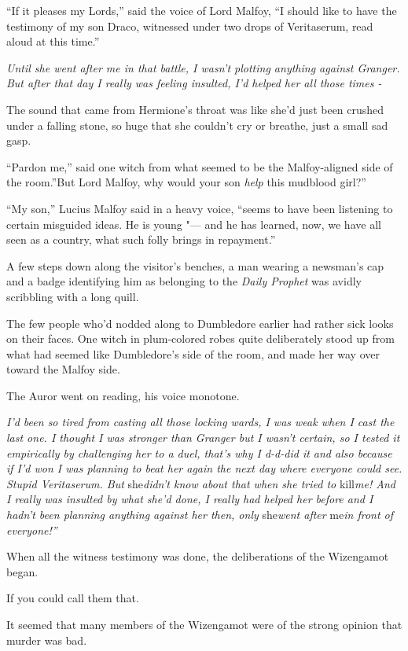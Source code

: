 ``If it pleases my Lords,'' said the voice of Lord Malfoy, ``I should
like to have the testimony of my son Draco, witnessed under two drops of
Veritaserum, read aloud at this time.''

\emph{Until she went after me in that battle, I wasn't plotting anything
against Granger. But after that day I really was feeling insulted, I'd
helped her all those times -}

The sound that came from Hermione's throat was like she'd just been
crushed under a falling stone, so huge that she couldn't cry or breathe,
just a small sad gasp.

``Pardon me,'' said one witch from what seemed to be the Malfoy-aligned
side of the room.''But Lord Malfoy, why would your son \emph{help} this
mudblood girl?''

``My son,'' Lucius Malfoy said in a heavy voice, ``seems to have been
listening to certain misguided ideas. He is young "--- and he has learned,
now, we have all seen as a country, what such folly brings in
repayment.''

A few steps down along the visitor's benches, a man wearing a newsman's
cap and a badge identifying him as belonging to the \emph{Daily Prophet}
was avidly scribbling with a long quill.

The few people who'd nodded along to Dumbledore earlier had rather sick
looks on their faces. One witch in plum-colored robes quite deliberately
stood up from what had seemed like Dumbledore's side of the room, and
made her way over toward the Malfoy side.

The Auror went on reading, his voice monotone.

\emph{I'd been so tired from casting all those locking wards, I was weak
when I cast the last one. I thought I was stronger than Granger but I
wasn't certain, so I tested it empirically by challenging her to a duel,
that's why I d-d-did it and also because if I'd won I was planning to
beat her again the next day where everyone could see. Stupid
Veritaserum. But} she\emph{didn't know about that when she tried to}
kill\emph{me! And I really was insulted by what she'd done, I really had
helped her before and I hadn't been planning anything against her then,
only} she\emph{went after} me\emph{in front of everyone!''}

When all the witness testimony was done, the deliberations of the
Wizengamot began.

If you could call them that.

It seemed that many members of the Wizengamot were of the strong opinion
that murder was bad.

